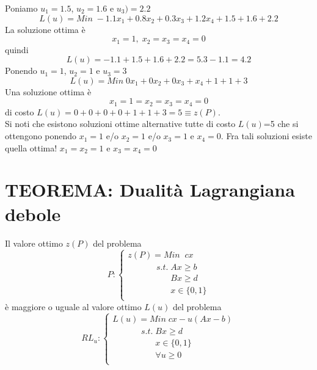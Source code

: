 Poniamo $u_{1}=1.5$, $u_{2}=1.6$ e $u_{3})=2.2$
\begin{equation*}
	L(u)=Min\; -1.1x_{1}+0.8x_{2}+0.3x_{3}+1.2x_{4}+1.5+1.6+2.2
\end{equation*}
La soluzione ottima è
\begin{equation*}
	x_{1}=1,\;x_{2}=x_{3}=x_{4}=0
\end{equation*}
quindi
\begin{equation*}
	L(u)=-1.1+1.5+1.6+2.2=5.3-1.1=4.2
\end{equation*}
Ponendo $u_{1}=1$, $u_{2}=1$ e $u_{3}=3$
\begin{equation*}
L(u)=Min\; 0x_{1}+0x_{2}+0x_{3}+x_{4}+1+1+3
\end{equation*}
Una soluzione ottima è
\begin{equation*}
x_{1}=1=x_{2}=x_{3}=x_{4}=0
\end{equation*}
di costo $L(u)=0+0+0+0+1+1+3=5\equiv z(P)$.\\
Si noti che esistono soluzioni ottime alternative tutte di costo $L(u)$=5 che si ottengono ponendo $x_{1}=1$ e/o $x_{2}=1$ e/o $x_{3}=1$ e $x_{4}=0$. Fra tali soluzioni esiste quella ottima! $x_{1}=x_{2}=1$ e $x_{3}=x_{4}=0$

\section{TEOREMA: Dualità Lagrangiana debole}
Il valore ottimo $z(P)$ del problema
\begin{displaymath}
P:
\begin{cases}
z(P)=Min\;\;cx \\
\;\;\;\;\;\;\;\;\;\;\;\;s.t.\;Ax\ge b \\
\;\;\;\;\;\;\;\;\;\;\;\;\;\;\;\;\;\;Bx\ge d \\
\;\;\;\;\;\;\;\;\;\;\;\;\;\;\;\;\;\;x\in \{0,1\} \\
\end{cases}
\end{displaymath}
è maggiore o uguale al valore ottimo $L(u)$ del problema
\begin{displaymath}
RL_{u}:
\begin{cases}
L(u)=Min\;cx-u(Ax-b) \\
\;\;\;\;\;\;\;\;\;\;\;\;s.t.\;Bx\ge d \\
\;\;\;\;\;\;\;\;\;\;\;\;\;\;\;\;\;\;x\in \{0,1\} \\
\;\;\;\;\;\;\;\;\;\;\;\;\;\;\;\;\;\;\forall u\ge 0 \\
\end{cases}
\end{displaymath}

